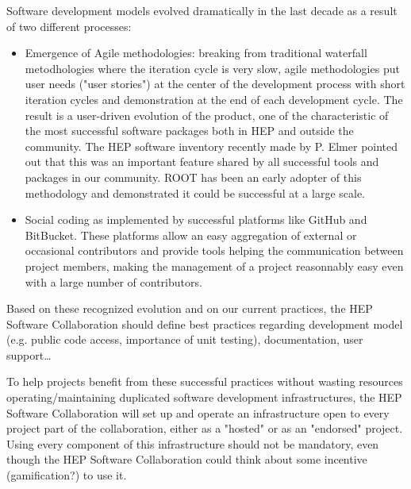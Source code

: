 \documentclass[11pt]{article} %
\begin{document}
Software development models evolved dramatically in the last decade as
a result of two different processes:

\begin{itemize}
\item 
Emergence of Agile methodologies: breaking from traditional
waterfall metodhologies where the iteration cycle is very slow, agile
methodologies put user needs ("user stories") at the center of the
development process with short iteration cycles and demonstration
at the end of each development cycle.
The result is a user-driven evolution of the product, one of the
characteristic of the most successful software packages both in HEP
and outside the community. 
The HEP software inventory recently made by P. Elmer pointed out that
this was an important feature shared by all successful tools and
packages in our community.
ROOT has been an early adopter of this methodology and demonstrated
it could be successful at a large scale.

\item 
Social coding as implemented by successful platforms like GitHub and
BitBucket.
These platforms allow an easy aggregation of external or occasional
contributors and provide tools helping the communication between
project members, making the management of a project reasonnably
easy even with a large number of contributors.

\end{itemize}

Based on these recognized evolution and on our current practices, the HEP Software Collaboration should define
best practices regarding development model (e.g. public code access, importance of unit testing), documentation, user support\ldots

To help projects benefit from these successful practices without
wasting resources operating/maintaining duplicated software
development infrastructures, the HEP Software Collaboration will set
up and operate an infrastructure open to every project part of the
collaboration, either as a "hosted" or as an "endorsed" project. Using
every component of this infrastructure should not be mandatory, even
though the HEP Software Collaboration could think about some incentive
(gamification?) to use it.
\end{document}
